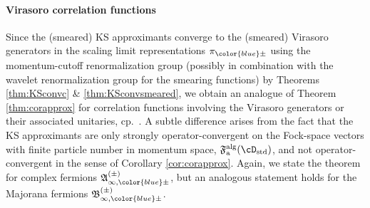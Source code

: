 \documentclass[a4paper, 11pt]{article}
\newcommand{\fA}{\mathfrak{A}}\newcommand{\cA}{\mathcal{A}}\newcommand{\dA}{\mathds{A}}\newcommand{\sA}{\mathscr{A}}
\newcommand{\ua}{\textup a}
\newcommand{\fB}{\mathfrak{B}}\newcommand{\cB}{\mathcal{B}}\newcommand{\dB}{\mathds{B}}\newcommand{\sB}{\mathscr{B}}
\newcommand{\fF}{\mathfrak{F}}\newcommand{\cF}{\mathcal{F}}\newcommand{\dF}{\mathds{F}}\newcommand{\sF}{\mathscr{F}}
\DeclareMathOperator{\1}{\mathds{1}}
\DeclareMathOperator{\std}{std}
\DeclareMathOperator{\alg}{alg}
\providecommand{\DIFaddend}{} %
\DeclareRobustCommand{\DIFaddend}{\DIFOaddend \let\includegraphics\DIFOincludegraphics} %
\begin{document}
\DIFaddend \paragraph{Virasoro correlation functions}
Since the (smeared) KS approximants converge to the (smeared) Virasoro generators in the scaling limit representations $\pi_{{\color{blue}\pm}}$ using the momentum-cutoff renormalization group (possibly in combination with the wavelet renormalization group for the smearing functions) by Theorems \ref{thm:KSconvc} \& \ref{thm:KSconvsmeared}, we obtain an analogue of Theorem \ref{thm:corapprox} for correlation functions involving the Virasoro generators or their associated unitaries, cp.~\cite{ZiniConformalFieldTheories}. A subtle difference arises from the fact that the KS approximants are only strongly operator-convergent on the Fock-space vectors with finite particle number in momentum space, $\fF^{\alg}_{\ua}(\cD_{\std})$, and not operator-convergent in the sense of Corollary \ref{cor:corapprox}. Again, we state the theorem for complex fermions $\fA^{(\pm)}_{\infty,{\color{blue}\pm}}$, but an analogous statement holds for the Majorana fermions $\fB^{(\pm)}_{\infty,{\color{blue}\pm}}$.
\end{document}
